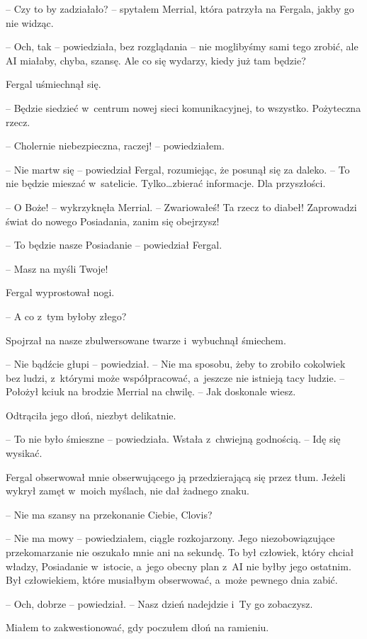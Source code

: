 \documentclass[oneside,polish,11pt,sfheadings]{mwbk}
\begin{document}
-- Czy to by zadziałało? -- spytałem Merrial, która patrzyła na Fergala,
jakby go nie widząc.

-- Och, tak -- powiedziała, bez rozglądania -- nie moglibyśmy sami tego
zrobić, ale AI miałaby, chyba, szansę. Ale co się wydarzy, kiedy już tam
będzie?

Fergal uśmiechnął się. 

-- Będzie siedzieć w~centrum nowej sieci
komunikacyjnej, to wszystko. Pożyteczna rzecz.

-- Cholernie niebezpieczna, raczej! -- powiedziałem.

-- Nie martw się -- powiedział Fergal, rozumiejąc, że posunął się za
daleko. -- To nie będzie mieszać w~satelicie. Tylko\ldots zbierać
informacje. Dla przyszłości.

-- O Boże! -- wykrzyknęła Merrial. -- Zwariowałeś! Ta rzecz to diabeł!
Zaprowadzi świat do nowego Posiadania, zanim się obejrzysz!

-- To będzie nasze Posiadanie -- powiedział Fergal.

-- Masz na myśli Twoje!

Fergal wyprostował nogi.

-- A co z~tym byłoby złego?

Spojrzał na nasze zbulwersowane twarze i~wybuchnął śmiechem.

-- Nie bądźcie głupi -- powiedział. -- Nie ma sposobu, żeby to zrobiło
cokolwiek bez ludzi, z~którymi może współpracować, a~jeszcze nie
istnieją tacy ludzie. -- Położył kciuk na brodzie Merrial na chwilę. -- Jak doskonale wiesz.

Odtrąciła jego dłoń, niezbyt delikatnie.

-- To nie było śmieszne -- powiedziała. Wstała z~chwiejną godnością. -- Idę
się wysikać.

Fergal obserwował mnie obserwującego ją przedzierającą się przez tłum.
Jeżeli wykrył zamęt w~moich myślach, nie dał żadnego znaku.

-- Nie ma szansy na przekonanie Ciebie, Clovis?

-- Nie ma mowy -- powiedziałem, ciągle rozkojarzony. Jego niezobowiązujące
przekomarzanie nie oszukało mnie ani na sekundę. To był człowiek, który
chciał władzy, Posiadanie w~istocie, a~jego obecny plan z~AI nie byłby
jego ostatnim. Był człowiekiem, które musiałbym obserwować, a~może
pewnego dnia zabić.

-- Och, dobrze -- powiedział. -- Nasz dzień nadejdzie i~Ty go zobaczysz.

Miałem to zakwestionować, gdy poczułem dłoń na ramieniu.
\end{document}
